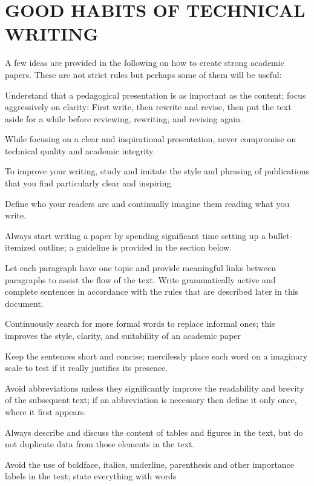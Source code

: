 \documentclass{ICASP13Paper}
\begin{document}
\section{GOOD HABITS OF TECHNICAL WRITING}
A few ideas are provided in the following on how to create strong academic 
papers. These are not strict rules but perhaps some of them will be useful:
\begin{compactitem}
  \item Understand that a pedagogical presentation is as important as the 
  content; focus aggressively on clarity: First write, then rewrite and revise, 
  then put the text aside for a while before reviewing, rewriting, and revising 
  again.
  \item While focusing on a clear and inspirational presentation, never 
  compromise on technical quality and academic integrity.
  \item To improve your writing, study and imitate the style and phrasing of 
  publications that you find particularly clear and inspiring.
  \item Define who your readers are and continually imagine them reading what 
  you write.
  \item Always start writing a paper by spending significant time setting up a 
  bullet-itemized outline; a guideline is provided in the section below.
  \item Let each paragraph have one topic and provide meaningful links between 
  paragraphs to assist the flow of the text. Write grammatically active and 
  complete sentences in accordance with the rules that are described later in 
  this document.
  \item Continuously search for more formal words to replace informal ones; 
  this improves the style, clarity, and suitability of an academic paper
  \item Keep the sentences short and concise; mercilessly place each word on a 
  imaginary scale to test if it really justifies its presence.
  \item Avoid abbreviations unless they significantly improve the readability 
  and brevity of the subsequent text; if an abbreviation is necessary then 
  define it only once, where it first appears.
  \item Always describe and discuss the content of tables and figures in the 
  text, but do not duplicate data from those elements in the text.
  \item Avoid the use of boldface, italics, underline, parenthesis and other 
  importance labels in the text; state everything with words
\end{compactitem}
\end{document}
